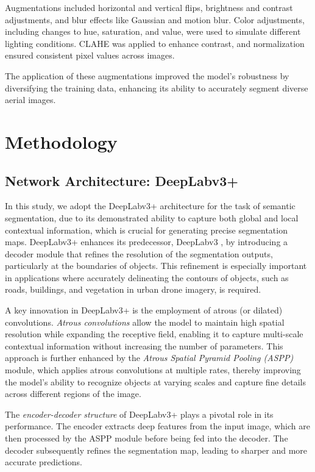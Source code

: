 \documentclass[a4paper]{article}
\begin{document}
Augmentations included horizontal and vertical flips, brightness and contrast adjustments, and blur effects like Gaussian and motion blur. Color adjustments, including changes to hue, saturation, and value, were used to simulate different lighting conditions. CLAHE was applied to enhance contrast, and normalization ensured consistent pixel values across images.

The application of these augmentations improved the model's robustness by diversifying the training data, enhancing its ability to accurately segment diverse aerial images.

\section{Methodology}
\subsection{Network Architecture: DeepLabv3+}
In this study, we adopt the DeepLabv3+ architecture \cite{deeplabv3plus2018} for the task of semantic segmentation, due to its demonstrated ability to capture both global and local contextual information, which is crucial for generating precise segmentation maps. DeepLabv3+ enhances its predecessor, DeepLabv3 \cite{deeplab2016}, by introducing a decoder module that refines the resolution of the segmentation outputs, particularly at the boundaries of objects. This refinement is especially important in applications where accurately delineating the contours of objects, such as roads, buildings, and vegetation in urban drone imagery, is required.

A key innovation in DeepLabv3+ is the employment of atrous (or dilated) convolutions. \textit{Atrous convolutions} allow the model to maintain high spatial resolution while expanding the receptive field, enabling it to capture multi-scale contextual information without increasing the number of parameters. This approach is further enhanced by the \textit{Atrous Spatial Pyramid Pooling (ASPP)} module, which applies atrous convolutions at multiple rates, thereby improving the model's ability to recognize objects at varying scales and capture fine details across different regions of the image.

The \textit{encoder-decoder structure} of DeepLabv3+ plays a pivotal role in its performance. The encoder extracts deep features from the input image, which are then processed by the ASPP module before being fed into the decoder. The decoder subsequently refines the segmentation map, leading to sharper and more accurate predictions.
\end{document}
